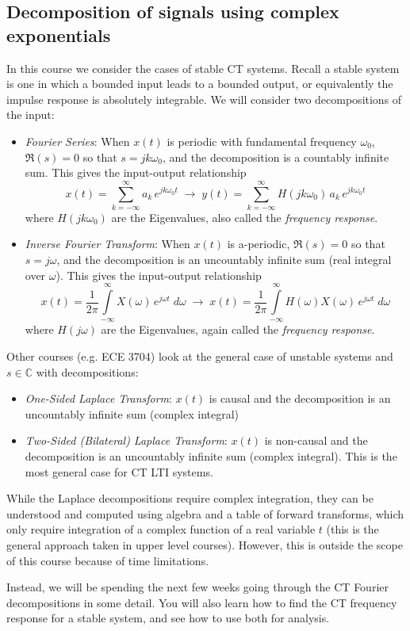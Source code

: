 \subsection{Decomposition of signals using complex exponentials}

In this course we consider the cases of stable CT systems. Recall a stable system is one in which a bounded input leads to a bounded output, or equivalently the impulse response is absolutely integrable. We will consider two decompositions of the input:

  \begin{itemize}
  \item \emph{Fourier Series}: When $x(t)$ is periodic with fundamental frequency $\omega_0$, $\Re{(s)} = 0$ so that $s = jk\omega_0$, and the decomposition is a countably infinite sum. This gives the input-output relationship
    \[
    x(t) = \sum\limits_{k = -\infty}^{\infty} a_k \, e^{j k\omega_0 t} \; \longrightarrow\; y(t) = \sum\limits_{k = -\infty}^{\infty} H(j k\omega_0)\, a_k \, e^{j k\omega_0 t}
    \]
    where $H(j k\omega_0)$ are the Eigenvalues, also called the \emph{frequency response}.
  \item \emph{Inverse Fourier Transform}: When $x(t)$ is a-periodic, $\Re{(s)} = 0$ so that $s = j\omega$, and the decomposition is an uncountably infinite sum (real integral over $\omega$). This gives the input-output relationship
    \[
    x(t) = \frac{1}{2\pi}\int\limits_{-\infty}^{\infty} X(\omega) \, e^{j \omega t}\; d\omega \;\longrightarrow\; x(t) = \frac{1}{2\pi}\int\limits_{-\infty}^{\infty} H(\omega) X(\omega) \, e^{j \omega t}\; d\omega
    \]
    where $H(j \omega)$ are the Eigenvalues, again called the \emph{frequency response}.  
  \end{itemize}

  Other courses (e.g. ECE 3704) look at the general case of unstable systems and $s \in \mathbb{C}$ with decompositions:

  \begin{itemize}
  \item \emph{One-Sided Laplace Transform}: $x(t)$ is causal and the decomposition is an uncountably infinite sum (complex integral)
  \item \emph{Two-Sided (Bilateral) Laplace Transform}: $x(t)$ is non-causal and the decomposition is an uncountably infinite sum (complex integral). This is the most general case for CT LTI systems.
  \end{itemize}

  While the Laplace decompositions require complex integration, they can be understood and computed using algebra and a table of forward transforms, which only require integration of a complex function of a real variable $t$ (this is the general approach taken in upper level courses). However, this is outside the scope of this course because of time limitations.

Instead, we will be spending the next few weeks going through the CT Fourier decompositions in some detail. You will also learn how to find the CT frequency response for a stable system, and see how to use both for analysis.

